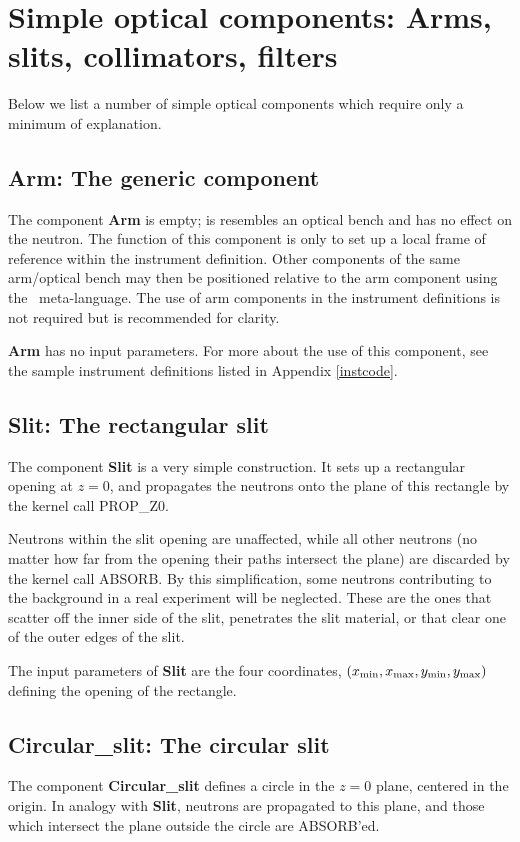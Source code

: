 
\section{Simple optical components:
Arms, slits, collimators, filters}
Below we list a number of simple optical components 
which require only a minimum of explanation.

\subsection{Arm: The generic component}
\label{explain:arm}
The component {\bf Arm} is empty; is resembles an optical bench
and has no effect on the neutron.
The function of this component is only to set up a local frame of
reference within the instrument definition. Other components of the
same arm/optical bench may then be
positioned relative to the arm component
using the \MCS\ meta-language.
The use of arm components in the instrument definitions
is not required but is recommended for clarity.

{\bf Arm} has no input parameters.
For more about the use of this component, see the 
sample instrument definitions listed in Appendix \ref{instcode}.


\subsection{Slit: The rectangular slit}
\label{slit}
The component {\bf Slit} is a very simple construction.
It sets up a rectangular opening at $z=0$, and propagates the neutrons 
onto the plane of this rectangle by the kernel call PROP\_Z0.

Neutrons within the slit opening are unaffected, 
while all other neutrons
(no matter how far from the opening their paths intersect the plane)
are discarded by the kernel call ABSORB.
By this simplification, some neutrons contributing to the background
in a real experiment will be neglected. 
These are the ones that scatter off the inner side
of the slit, penetrates the slit material, 
or that clear one of the outer edges of the slit.

The input parameters of {\bf Slit} are the four coordinates,
$(x_{\rm min}, x_{\rm max}, y_{\rm min}, y_{\rm max})$
defining the opening of the rectangle.

\subsection{Circular\_slit: The circular slit}
The component {\bf Circular\_slit} defines a circle in the $z=0$ plane,
centered in the origin. In analogy with {\bf Slit},
neutrons are propagated to this plane, and those which intersect
the plane outside the circle are ABSORB'ed.

